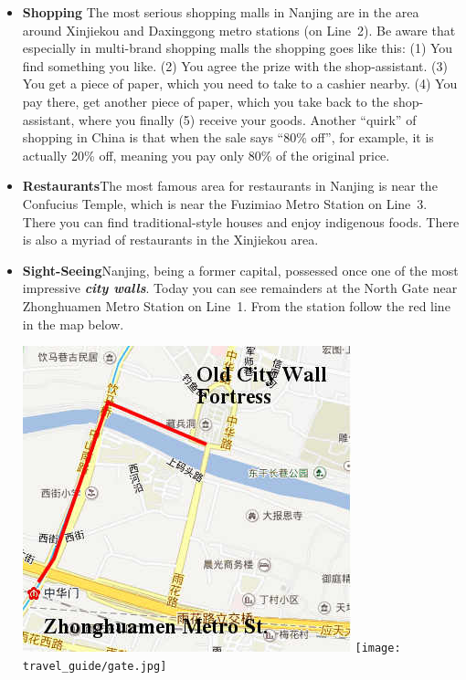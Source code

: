 \documentclass[11pt]{report}
\begin{document}
\begin{itemize}
\item\textbf{Shopping}\hspace{3mm}
The most serious shopping malls in Nanjing are in the area
around Xinjiekou and Daxinggong metro stations (on Line~2). Be
aware that especially in multi-brand shopping malls the
shopping goes like this: (1) You find something you like. (2)
You agree the prize with the shop-assistant. (3) You get a
piece of paper, which you need to take to a cashier nearby.
(4) You pay there, get another piece of paper, which you take
back to the shop-assistant, where you finally (5) receive your
goods. Another ``quirk'' of shopping in China is that when the
sale says ``80\% off'', for example, it is actually 20\% off,
meaning you pay only 80\% of the original price.

\item\textbf{Restaurants}\hspace{3mm}The most famous area
for restaurants in Nanjing is near the Confucius Temple, which
is near the Fuzimiao Metro Station on Line~3. There you
can find traditional-style houses and enjoy indigenous foods. 
There is also a myriad of restaurants in the Xinjiekou area. 

\item\textbf{Sight-Seeing}\hspace{3mm}Nanjing, being a former 
capital, possessed once one of the most impressive 
\textbf{\textit{city walls}}. 
Today you can see remainders at the North Gate near 
Zhonghuamen Metro Station on Line~1. From the station follow
the red line in the map below.

\begin{center}
\includegraphics[scale=0.4]{travel_guide/map3.jpg}
\hspace{5mm}
\texttt{[image: travel\_guide/gate.jpg]}
\end{center}



\end{itemize}
\end{document}

